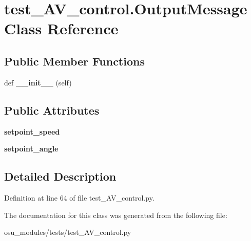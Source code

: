 \hypertarget{classtest__AV__control_1_1OutputMessage}{}\section{test\+\_\+\+A\+V\+\_\+control.\+Output\+Message Class Reference}
\label{classtest__AV__control_1_1OutputMessage}
\subsection*{Public Member Functions}
\begin{DoxyCompactItemize}
\item 
\mbox{\label{classtest__AV__control_1_1OutputMessage_a4b94bae4e002e2a91db9d1dc0684c80f}} 
def {\bfseries \+\_\+\+\_\+init\+\_\+\+\_\+} (self)
\end{DoxyCompactItemize}
\subsection*{Public Attributes}
\begin{DoxyCompactItemize}
\item 
\mbox{\label{classtest__AV__control_1_1OutputMessage_a96e0a3d28610127e9d046f5757439ee1}} 
{\bfseries setpoint\+\_\+speed}
\item 
\mbox{\label{classtest__AV__control_1_1OutputMessage_a04ad848935a73bf703b04f89539f76d9}} 
{\bfseries setpoint\+\_\+angle}
\end{DoxyCompactItemize}


\subsection{Detailed Description}


Definition at line 64 of file test\+\_\+\+A\+V\+\_\+control.\+py.



The documentation for this class was generated from the following file\+:\begin{DoxyCompactItemize}
\item 
osu\+\_\+modules/tests/test\+\_\+\+A\+V\+\_\+control.\+py\end{DoxyCompactItemize}
